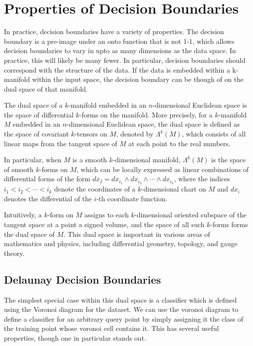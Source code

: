 \section{Properties of Decision Boundaries}

In practice, decision boundaries have a variety of properties. The
decision boundary is a pre-image under an onto function that is not
1-1, which allows decision boundaries to vary in upto as many
dimensions as the data space. In practice, this will likely be many
fewer. In particular, decision boundaries should correspond with the
structure of the data. If the data is embedded within a k-manifold
within the input space, the decision boundary can be though of on the
dual space of that manifold.

The dual space of a $k$-manifold embedded in an $n$-dimensional Euclidean space is the space of differential $k$-forms on the manifold. More precisely, for a $k$-manifold $M$ embedded in an $n$-dimensional Euclidean space, the dual space is defined as the space of covariant $k$-tensors on $M$, denoted by $\Lambda^k(M)$, which consists of all linear maps from the tangent space of $M$ at each point to the real numbers.

In particular, when $M$ is a smooth $k$-dimensional manifold, $\Lambda^k(M)$ is the space of smooth $k$-forms on $M$, which can be locally expressed as linear combinations of differential forms of the form $dx_I = dx_{i_1} \wedge dx_{i_2} \wedge \cdots \wedge dx_{i_k}$, where the indices $i_1 < i_2 < \cdots < i_k$ denote the coordinates of a $k$-dimensional chart on $M$ and $dx_i$ denotes the differential of the $i$-th coordinate function.

Intuitively, a $k$-form on $M$ assigns to each $k$-dimensional oriented subspace of the tangent space at a point a signed volume, and the space of all such $k$-forms forms the dual space of $M$. This dual space is important in various areas of mathematics and physics, including differential geometry, topology, and gauge theory.

\subsection{Delaunay Decision Boundaries}

The simplest special case within this dual space is a classifier which
is defined using the Voronoi diagram for the dataset. We can use the
voronoi diagram to define a classifier for an arbitrary query point by
simply assigning it the class of the training point whose voronoi cell
contains it. This has several useful properties, though one in
particular stands out.

